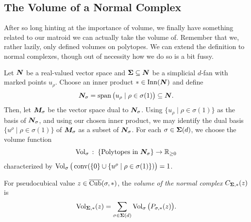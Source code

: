 \documentclass[12pt,oneside]{../../sfsuthesis}
\begin{document}


\subsection{The Volume of a Normal Complex}
After so long hinting at the importance of volume, we finally have something related to our matroid we can actually take the volume of.
Remember that we, rather lazily, only defined volumes on polytopes.
We can extend the definition to normal complexes, though out of necessity how we do so is a bit fussy.
\begin{definition}\th\label{def:volNormalComplex}
    Let \( \bm{N} \) be a real-valued vector space and \( \bm{\Sigma} \subseteq \bm{N} \) be a simplicial \( d \)-fan with marked points \( u_\rho \).
    Choose an inner product \( \ast \in \operatorname{Inn}(\bm{N}) \) and define
    \[
        \bm{N}_\sigma = \operatorname{span}\big(u_\rho \; | \; \rho \in \sigma(1)\big) \subseteq \bm{N}.
    \]
    Then, let \( \bm{M}_\sigma \) be the vector space dual to \( \bm{N}_\sigma \).
    Using \( \{ u_\rho \; | \; \rho \in \sigma(1) \} \) as the basis of \( \bm{N}_\sigma \), and using our chosen inner product, we may identify the dual basis \( \{ u^\rho \; | \; \rho \in \sigma(1) \} \) of \( \bm{M}_\sigma \) as a subset of \( \bm{N}_\sigma \).
    For each \( \sigma \in \bm{\Sigma}(d) \), we choose the volume function
    \[
        \operatorname{Vol}_\sigma \,:\; \{\text{Polytopes in \( \bm{N}_\sigma \)} \}  \to \mathbb{R}_{\geq 0}
    \]
    characterized by \( \operatorname{Vol}_\sigma\big( \operatorname{conv}( \{0\} \cup \{u^\rho \; | \; \rho \in \sigma(1)\})\big) = 1 \).

    For pseudocubical value \( z \in \operatorname{\overline{Cub}}(\sigma, \ast) \), the \emph{volume of the normal complex} \(  C_{\bm{\Sigma}, \ast}(z) \) is
    \[
        \operatorname{Vol}_{\bm{\Sigma}, \ast}(z) = \sum_{\sigma \in \bm{\Sigma}(d)} \operatorname{Vol}_\sigma\big(P_{\sigma, \ast}(z)\big).
    \]
\end{definition}
\end{document}
